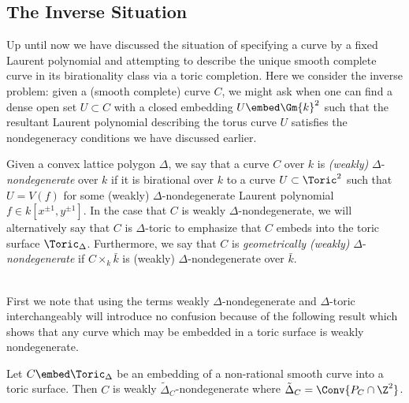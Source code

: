 \subsection{The Inverse Situation}

Up until now we have discussed the situation of specifying a curve by a fixed Laurent polynomial and attempting to describe the unique smooth complete curve in its birationality class via a toric completion. Here we consider the inverse problem: given a (smooth complete) curve $C$, we might ask when one can find a dense open set $U \subset C$ with a closed embedding $U \embed \Gm{k}^2$ such that the resultant Laurent polynomial describing the torus curve $U$ satisfies the nondegeneracy conditions we have discussed earlier. 

\begin{defn}
Given a convex lattice polygon $\Delta$, we say that a curve $C$ over $k$ is \textit{(weakly)} $\Delta$-\textit{nondegenerate} over $k$ if it is birational over $k$ to a curve $U \subset \Toric^2$ such that $U = V(f)$ for some (weakly) $\Delta$-nondegenerate Laurent polynomial $f \in k[x^{\pm 1}, y^{\pm 1}]$. In the case that $C$ is weakly $\Delta$-nondegenerate, we will alternatively say that $C$ is $\Delta$-toric to emphasize that $C$ embeds into the toric surface $\Toric_\Delta$. Furthermore, we say that $C$ is \textit{geometrically (weakly)} $\Delta$-\textit{nondegenerate} if $C \times_k \bar{k}$ is (weakly) $\Delta$-nondegenerate over $\bar{k}$.  
\end{defn}
\noindent\\
First we note that using the terms weakly $\Delta$-nondegenerate and $\Delta$-toric interchangeably will introduce no confusion because of the following result which shows that any curve which may be embedded in a toric surface is weakly nondegenerate.

\begin{prop}
Let $C \embed \Toric_\Delta$ be an embedding of a non-rational smooth curve into a toric surface. Then $C$ is weakly $\tilde{\Delta}_C$-nondegenerate where $\tilde{\Delta}_C = \Conv{P_C \cap \Z^2}$. 
\end{prop}

